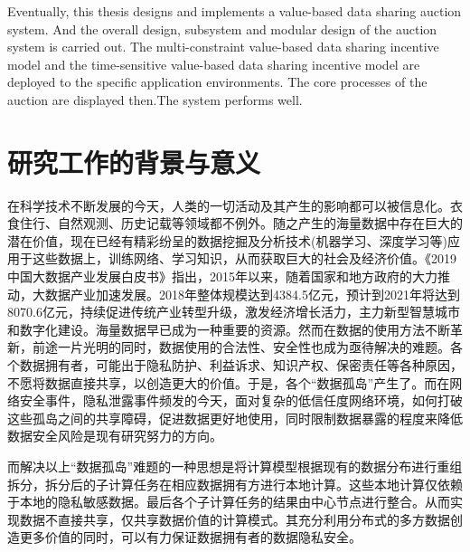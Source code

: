 \documentclass[promaster]{thesis-uestc}
\begin{document}
\begin{englishabstract}
Eventually, this thesis designs and implements a value-based data sharing auction system. And the overall design, subsystem and modular design of the auction system is carried out. The multi-constraint value-based data sharing incentive model and the time-sensitive value-based data sharing incentive model are deployed to the specific application environments. The core processes of the auction are displayed then.The system performs well.

\end{englishabstract}

\thesistableofcontents

\thesischapterexordium

\section{研究工作的背景与意义}

在科学技术不断发展的今天，人类的一切活动及其产生的影响都可以被信息化。衣食住行、自然观测、历史记载等领域都不例外。随之产生的海量数据中存在巨大的潜在价值，现在已经有精彩纷呈的数据挖掘及分析技术(机器学习、深度学习等)应用于这些数据上，训练网络、学习知识，从而获取巨大的社会及经济价值。《2019中国大数据产业发展白皮书》指出，2015年以来，随着国家和地方政府的大力推动，大数据产业加速发展。2018年整体规模达到4384.5亿元，预计到2021年将达到8070.6亿元，持续促进传统产业转型升级，激发经济增长活力，主力新型智慧城市和数字化建设。海量数据早已成为一种重要的资源。然而在数据的使用方法不断革新，前途一片光明的同时，数据使用的合法性、安全性也成为亟待解决的难题。各个数据拥有者，可能出于隐私防护、利益诉求、知识产权、保密责任等各种原因，不愿将数据直接共享，以创造更大的价值。于是，各个“数据孤岛”产生了。而在网络安全事件，隐私泄露事件频发的今天，面对复杂的低信任度网络环境，如何打破这些孤岛之间的共享障碍，促进数据更好地使用，同时限制数据暴露的程度来降低数据安全风险是现有研究努力的方向。

而解决以上“数据孤岛”难题的一种思想是将计算模型根据现有的数据分布进行重组拆分，拆分后的子计算任务在相应数据拥有方进行本地计算。这些本地计算仅依赖于本地的隐私敏感数据。最后各个子计算任务的结果由中心节点进行整合。从而实现数据不直接共享，仅共享数据价值的计算模式。其充分利用分布式的多方数据创造更多价值的同时，可以有力保证数据拥有者的数据隐私安全。

\end{document}
